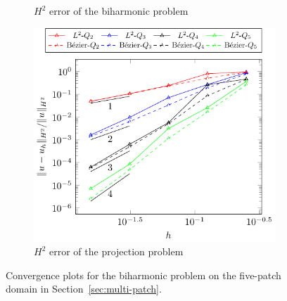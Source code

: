 \documentclass[preprint,12pt]{elsarticle}
\theoremstyle{remark}
\begin{document}
\begin{figure}
\begin{subfigure}{0.48\textwidth}
      \caption{$H^2$ error of the biharmonic problem}
    \end{subfigure}\par\medskip
    \begin{subfigure}{0.48\textwidth}
      \centering
      \includegraphics[width=\linewidth]{five_patch_projection_basic_H2}
      \caption{$H^2$ error of the projection problem}
    \end{subfigure}%
    \caption{Convergence plots for the biharmonic problem on the five-patch domain in Section~\ref{sec:multi-patch}.}
    \label{fig:five_patch_result}
\end{figure}
\end{document}
